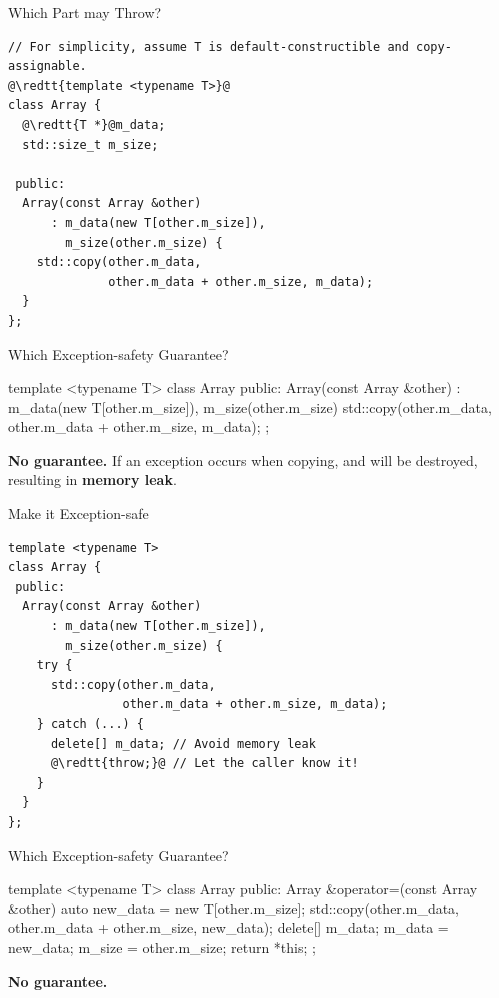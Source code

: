 \documentclass{beamer}
\begin{document}
\begin{frame}[fragile]{Which Part may Throw?}
  \begin{lstlisting}[language = {[11]C++}, escapechar = \@]
// For simplicity, assume T is default-constructible and copy-assignable.
@\redtt{template <typename T>}@
class Array {
  @\redtt{T *}@m_data;
  std::size_t m_size;

 public:
  Array(const Array &other)
      : m_data(new T[other.m_size]),
        m_size(other.m_size) {
    std::copy(other.m_data,
              other.m_data + other.m_size, m_data);
  }
};
  \end{lstlisting}
\end{frame}

\begin{frame}[fragile]{Which Exception-safety Guarantee?}
  \begin{cpp}
template <typename T>
class Array {
 public:
  Array(const Array &other)
      : m_data(new T[other.m_size]),
        m_size(other.m_size) {
    std::copy(other.m_data,
              other.m_data + other.m_size, m_data);
  }
};
  \end{cpp}
  \pause
  \textbf{No guarantee.} If an exception occurs when copying,  and  will be destroyed, resulting in \textbf{memory leak}.
\end{frame}

\begin{frame}[fragile]{Make it Exception-safe}
  \begin{lstlisting}[language = {[11]C++}, escapechar = \@]
template <typename T>
class Array {
 public:
  Array(const Array &other)
      : m_data(new T[other.m_size]),
        m_size(other.m_size) {
    try {
      std::copy(other.m_data,
                other.m_data + other.m_size, m_data);
    } catch (...) {
      delete[] m_data; // Avoid memory leak
      @\redtt{throw;}@ // Let the caller know it!
    }
  }
};
  \end{lstlisting}
\end{frame}

\begin{frame}[fragile]{Which Exception-safety Guarantee?}
  \begin{cpp}
template <typename T>
class Array {
 public:
  Array &operator=(const Array &other) {
    auto new_data = new T[other.m_size];
    std::copy(other.m_data,
              other.m_data + other.m_size, new_data);
    delete[] m_data;
    m_data = new_data;
    m_size = other.m_size;
    return *this;
  }
};
  \end{cpp}
  \pause
  \textbf{No guarantee.}
\end{frame}
\end{document}
